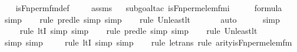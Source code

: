 \begin{isabellebody}
%
\isadelimproof
\ \ %
\endisadelimproof
%
\isatagproof
{}\isamarkupfalse%
\ is{\isacharunderscore}{\kern0pt}Fn{\isacharunderscore}{\kern0pt}perm{\isacharunderscore}{\kern0pt}fm{\isacharunderscore}{\kern0pt}def\ \isanewline
\ \ \isamarkupfalse%
\ assms\isanewline
\ \ \isamarkupfalse%
{\isacharparenleft}{\kern0pt}subgoal{\isacharunderscore}{\kern0pt}tac\ {\isachardoublequoteopen}is{\isacharunderscore}{\kern0pt}Fn{\isacharunderscore}{\kern0pt}perm{\isacharunderscore}{\kern0pt}elem{\isacharunderscore}{\kern0pt}fm{\isacharparenleft}{\kern0pt}i\ {\isacharhash}{\kern0pt}{\isacharplus}{\kern0pt}\ {}{\isacharcomma}{\kern0pt}\ {}{\isacharcomma}{\kern0pt}\ {}{\isacharparenright}{\kern0pt}\ {\isasymin}\ formula{\isachardoublequoteclose}{\isacharparenright}{\kern0pt}\isanewline
\ \ \isamarkupfalse%
\ simp\isanewline
\ \ \ \isamarkupfalse%
{\isacharparenleft}{\kern0pt}rule\ pred{\isacharunderscore}{\kern0pt}le{\isacharcomma}{\kern0pt}\ simp{\isacharcomma}{\kern0pt}\ simp{\isacharparenright}{\kern0pt}\isanewline
\ \ \ \isamarkupfalse%
{\isacharparenleft}{\kern0pt}rule\ Un{\isacharunderscore}{\kern0pt}least{\isacharunderscore}{\kern0pt}lt{\isacharparenright}{\kern0pt}{\isacharplus}{\kern0pt}\isanewline
\ \ \ \ \ \isamarkupfalse%
\ auto{\isacharbrackleft}{\kern0pt}{}{\isacharbrackright}{\kern0pt}\isanewline
\ \ \ \ \isamarkupfalse%
\ simp\isanewline
\ \ \ \ \isamarkupfalse%
{\isacharparenleft}{\kern0pt}rule\ ltI{\isacharcomma}{\kern0pt}\ simp{\isacharcomma}{\kern0pt}\ simp{\isacharparenright}{\kern0pt}\isanewline
\ \ \ \isamarkupfalse%
{\isacharparenleft}{\kern0pt}rule\ pred{\isacharunderscore}{\kern0pt}le{\isacharcomma}{\kern0pt}\ simp{\isacharcomma}{\kern0pt}\ simp{\isacharparenright}{\kern0pt}\isanewline
\ \ \ \isamarkupfalse%
{\isacharparenleft}{\kern0pt}rule\ Un{\isacharunderscore}{\kern0pt}least{\isacharunderscore}{\kern0pt}lt{\isacharparenright}{\kern0pt}{\isacharplus}{\kern0pt}\isanewline
\ \ \ \ \ \isamarkupfalse%
\ {\isacharparenleft}{\kern0pt}simp{\isacharcomma}{\kern0pt}\ simp{\isacharparenright}{\kern0pt}\isanewline
\ \ \ \ \isamarkupfalse%
{\isacharparenleft}{\kern0pt}rule\ ltI{\isacharcomma}{\kern0pt}\ simp{\isacharcomma}{\kern0pt}\ simp{\isacharparenright}{\kern0pt}\isanewline
\ \ \ \isamarkupfalse%
{\isacharparenleft}{\kern0pt}rule\ le{\isacharunderscore}{\kern0pt}trans{\isacharcomma}{\kern0pt}\ rule\ arity{\isacharunderscore}{\kern0pt}is{\isacharunderscore}{\kern0pt}Fn{\isacharunderscore}{\kern0pt}perm{\isacharunderscore}{\kern0pt}elem{\isacharunderscore}{\kern0pt}fm{\isacharparenright}{\kern0pt}\isanewline

\end{isabellebody}
